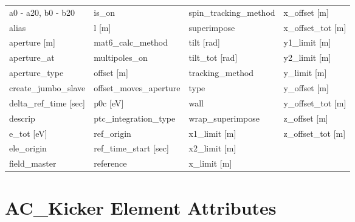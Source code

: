  \begin{tabular}{llll} \toprule
a0 - a20, b0 - b20               & is_on                            & spin_tracking_method             & x_offset [m]                     \\
alias                            & l [m]                            & superimpose                      & x_offset_tot [m]                 \\
aperture [m]                     & mat6_calc_method                 & tilt [rad]                       & y1_limit [m]                     \\
aperture_at                      & multipoles_on                    & tilt_tot [rad]                   & y2_limit [m]                     \\
aperture_type                    & offset [m]                       & tracking_method                  & y_limit [m]                      \\
create_jumbo_slave               & offset_moves_aperture            & type                             & y_offset [m]                     \\
delta_ref_time [sec]             & p0c [eV]                         & wall                             & y_offset_tot [m]                 \\
descrip                          & ptc_integration_type             & wrap_superimpose                 & z_offset [m]                     \\
e_tot [eV]                       & ref_origin                       & x1_limit [m]                     & z_offset_tot [m]                 \\
ele_origin                       & ref_time_start [sec]             & x2_limit [m]                     &                                  \\
field_master                     & reference                        & x_limit [m]                      &                                  \\
 \bottomrule
 \end{tabular}
 \vfill
 
 \section{AC_Kicker Element Attributes}
 \label{s:list.ac.kicker}
 
